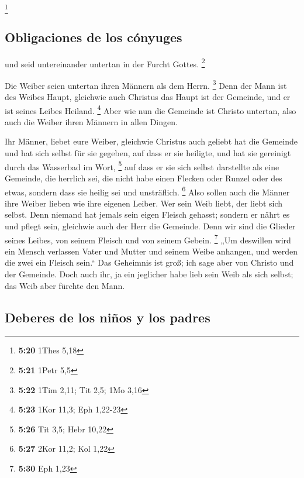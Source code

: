 \footnote{\textbf{5:20} 1Thes 5,18}

\hypertarget{obligaciones-de-los-cuxf3nyuges}{%
\subsection{Obligaciones de los
cónyuges}\label{obligaciones-de-los-cuxf3nyuges}}

 und seid untereinander untertan in der Furcht Gottes.
\footnote{\textbf{5:21} 1Petr 5,5}

 Die Weiber seien untertan ihren Männern als dem Herrn.
\footnote{\textbf{5:22} 1Tim 2,11; Tit 2,5; 1Mo 3,16} 
Denn der Mann ist des Weibes Haupt, gleichwie auch Christus das Haupt
ist der Gemeinde, und er ist seines Leibes Heiland. \footnote{\textbf{5:23}
  1Kor 11,3; Eph 1,22-23}  Aber wie nun die Gemeinde ist
Christo untertan, also auch die Weiber ihren Männern in allen Dingen.

 Ihr Männer, liebet eure Weiber, gleichwie Christus auch
geliebt hat die Gemeinde und hat sich selbst für sie gegeben,
 auf dass er sie heiligte, und hat sie gereinigt durch
das Wasserbad im Wort, \footnote{\textbf{5:26} Tit 3,5; Hebr 10,22}
 auf dass er sie sich selbst darstellte als eine
Gemeinde, die herrlich sei, die nicht habe einen Flecken oder Runzel
oder des etwas, sondern dass sie heilig sei und unsträflich. \footnote{\textbf{5:27}
  2Kor 11,2; Kol 1,22}  Also sollen auch die Männer ihre
Weiber lieben wie ihre eigenen Leiber. Wer sein Weib liebt, der liebt
sich selbst.  Denn niemand hat jemals sein eigen Fleisch
gehasst; sondern er nährt es und pflegt sein, gleichwie auch der Herr
die Gemeinde.  Denn wir sind die Glieder seines Leibes,
von seinem Fleisch und von seinem Gebein. \footnote{\textbf{5:30} Eph
  1,23}  „Um deswillen wird ein Mensch verlassen Vater
und Mutter und seinem Weibe anhangen, und werden die zwei ein Fleisch
sein.``  Das Geheimnis ist groß; ich sage aber von
Christo und der Gemeinde.  Doch auch ihr, ja ein
jeglicher habe lieb sein Weib als sich selbst; das Weib aber fürchte den
Mann.

\hypertarget{deberes-de-los-niuxf1os-y-los-padres}{%
\subsection{Deberes de los niños y los
padres}\label{deberes-de-los-niuxf1os-y-los-padres}}

